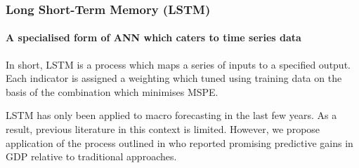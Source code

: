\begin{frame}
\frametitle{Long Short-Term Memory (LSTM)}
\framesubtitle{A specialised form of ANN which caters to time series data} 

In short, LSTM is a process which maps a series of inputs to a specified output. Each indicator is assigned a weighting which tuned using training data on the basis of the combination which minimises MSPE. 

\vspace{5mm}

LSTM has only been applied to macro forecasting in the last few years. As a result, previous literature in this context is limited. However, we propose application of the process outlined in \parencite{hopp_benchmarking_2022} who reported promising predictive gains in GDP relative to traditional approaches. 

    
\end{frame}